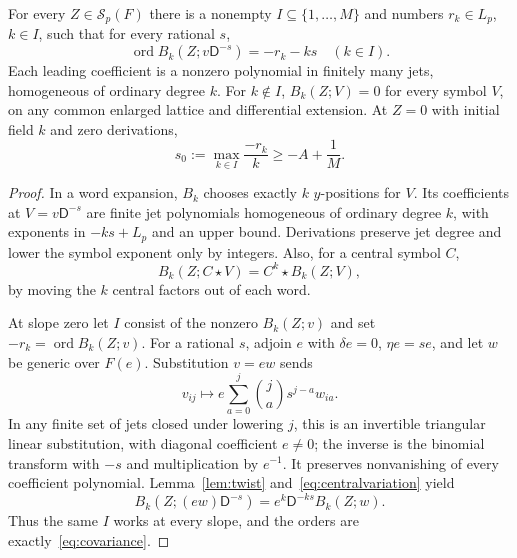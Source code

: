 \documentclass{article}
\newcommand{\DD}{\mathsf D}
\newcommand{\ord}{\operatorname{ord}}
\newcommand{\Sf}{\mathcal S}
\begin{document}
\begin{lemma}\label{lem:variation}
For every $Z\in\Sf_p(F)$ there is a nonempty $I\subseteq\{1,\ldots,M\}$ and numbers $r_k\in L_p$, $k\in I$, such that for every rational $s$,
\[
 \ord B_k(Z;v\DD^{-s})=-r_k-ks\quad(k\in I).
 \tag{3.5}\label{eq:covariance}
\]
Each leading coefficient is a nonzero polynomial in finitely many jets, homogeneous of ordinary degree $k$. For $k\notin I$, $B_k(Z;V)=0$ for every symbol $V$, on any common enlarged lattice and differential extension. At $Z=0$ with initial field $k$ and zero derivations,
\[
 s_0:=\max_{k\in I}\frac{-r_k}{k}\geq-A+\frac1M.
 \tag{3.6}\label{eq:initialslope}
\]
\end{lemma}
\begin{proof}
In a word expansion, $B_k$ chooses exactly $k$ $y$-positions for $V$. Its coefficients at $V=v\DD^{-s}$ are finite jet polynomials homogeneous of ordinary degree $k$, with exponents in $-ks+L_p$ and an upper bound. Derivations preserve jet degree and lower the symbol exponent only by integers. Also, for a central symbol $C$,
\[
 B_k(Z;C\star V)=C^k\star B_k(Z;V),
 \tag{3.7}\label{eq:centralvariation}
\]
by moving the $k$ central factors out of each word.

At slope zero let $I$ consist of the nonzero $B_k(Z;v)$ and set $-r_k=\ord B_k(Z;v)$. For a rational $s$, adjoin $e$ with $\delta e=0$, $\eta e=se$, and let $w$ be generic over $F(e)$. Substitution $v=ew$ sends
\[
 v_{ij}\longmapsto e\sum_{a=0}^j\binom ja s^{j-a}w_{ia}.
 \tag{3.8}\label{eq:jetsubstitution}
\]
In any finite set of jets closed under lowering $j$, this is an invertible triangular linear substitution, with diagonal coefficient $e\ne0$; the inverse is the binomial transform with $-s$ and multiplication by $e^{-1}$. It preserves nonvanishing of every coefficient polynomial. Lemma~\ref{lem:twist} and~\eqref{eq:centralvariation} yield
\[
 B_k(Z;(ew)\DD^{-s})=e^k\DD^{-ks}B_k(Z;w).
\]
Thus the same $I$ works at every slope, and the orders are exactly~\eqref{eq:covariance}.


\end{proof}
\end{document}
